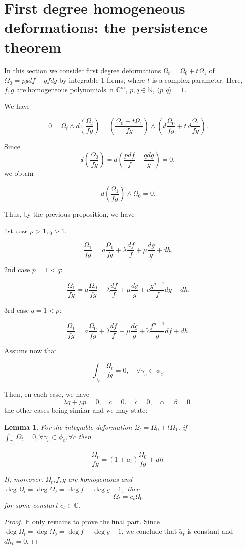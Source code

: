 \documentclass[11pt,a4paper]{amsart}
\newtheorem{lemma}[theorem]{Lemma}
\theoremstyle{definition}
\begin{document}
\section{First degree homogeneous deformations: the persistence theorem}

In this section we consider first degree deformations
$\Omega_t = \Omega_0 + t \Omega_1$
of
$
\Omega_0 = p g df - q f dg
$
by integrable 1-forms, where $t$ is a complex parameter.
Here, \(f,g\) are homogeneous polynomials in \(\mathbb C^m\),
\(p,q \in \mathbb N\), \(\langle p,q \rangle = 1\).

We have

\[
0 = \Omega_t \wedge d\!\left(\frac{\Omega_t}{fg}\right)
=
\left(\frac{\Omega_0 + t\Omega_1}{fg}\right)
\wedge
\left(d\frac{\Omega_0}{fg} + t\, d\frac{\Omega_1}{fg}\right).
\]

Since
\[
d\!\left(\frac{\Omega_0}{fg}\right)
=
d\!\left(\frac{p df}{f} - \frac{q dg}{g}\right)
=0,
\]
we obtain

\[
d\!\left(\frac{\Omega_1}{fg}\right) \wedge \Omega_0 = 0.
\]

Thus, by the previous proposition, we have

1st case \(p>1, q>1\):

\[
\frac{\Omega_1}{fg}
=
a \frac{\Omega_0}{fg}
+ \lambda \frac{df}{f}
+ \mu \frac{dg}{g}
+ dh.
\]

2nd case \(p=1<q\):

\[
\frac{\Omega_1}{fg}
=
a \frac{\Omega_0}{fg}
+ \lambda \frac{df}{f}
+ \mu \frac{dg}{g}
+ c \frac{g^{q-1}}{f} dg
+ dh.
\]

3rd case \(q=1<p\):

\[
\frac{\Omega_1}{fg}
=
a \frac{\Omega_0}{fg}
+ \lambda \frac{df}{f}
+ \mu \frac{dg}{g}
+ \tilde c \frac{f^{p-1}}{g} df
+ dh.
\]

Assume now that

\[
\int_{\gamma_c} \frac{\Omega_t}{fg} = 0,
\quad \forall \gamma_c \subset \phi_c.
\]

Then, on each case, we have
\[
\lambda q + \mu p = 0,
\quad
c=0,
\quad
\tilde c=0,
\quad
\alpha=\beta=0,
\]
the other cases being similar and we may state:
\begin{lemma}
For the integrable deformation $\Omega_t = \Omega_0 + t \Omega_1$, if 
$\int_{\gamma_c} \Omega_t=0, \forall \gamma_c \subset \phi_c, \forall c$ then 

\[
\frac{\Omega_t}{fg}
=
(1+\tilde a_t) \frac{\Omega_0}{fg}
+ dh.
\]

If, moreover, \(\Omega_t, f,g\) are homogeneous and
$
\deg \Omega_t = \deg \Omega_0 = \deg f + \deg g - 1,
$
then
\[
\Omega_t = c_t \Omega_0
\]
for some constant \(c_t \in \mathbb C\).
\end{lemma}
\begin{proof}
It only remains to prove the final part. Since 
$\deg \Omega_t = \deg \Omega_0 = \deg f + \deg g -1$, we conclude that 
$\tilde a_t$ is constant and $dh_t=0$. 
\end{proof}
\end{document}
